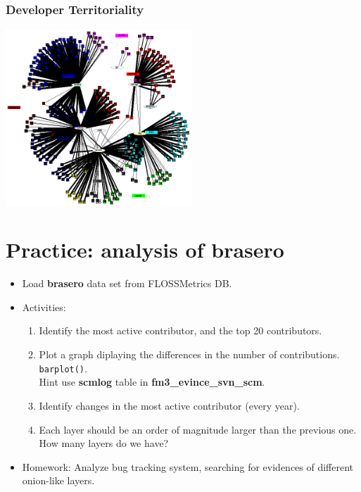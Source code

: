 \documentclass{beamer}
\begin{document}
\begin{frame}
\frametitle{Developer Territoriality}

\begin{center}
\includegraphics[width=7cm]{figs/german-territoriality.png}
\end{center}

\end{frame}


\section{Practice: analysis of \bfseries{brasero}}


\begin{frame}
 \begin{itemize}
  \item Load \textbf{brasero} data set from FLOSSMetrics DB.
  \item Activities:
  \begin{enumerate}
   \item Identify the most active contributor, and the top 20 contributors.
   \item Plot a graph diplaying the differences in the number of contributions.
   \texttt{barplot()}.\\Hint use \textbf{scmlog} table in \textbf{fm3\_evince\_svn\_scm}.
   \item Identify changes in the most active contributor (every year).\\
   \item Each layer should be an order of magnitude larger than the
   previous one. How many layers do we have?
  \end{enumerate}
  \item Homework: Analyze bug tracking system, searching for evidences
  of different onion-like layers.
 \end{itemize}
\end{frame}
\end{document}
